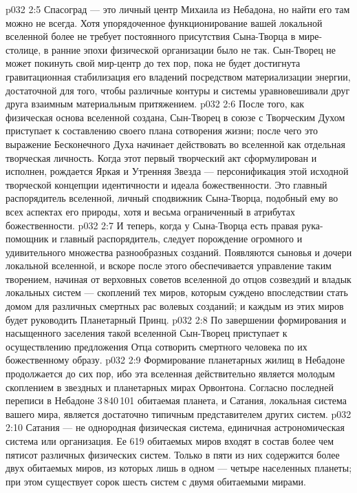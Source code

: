 \vs p032 2:5 Спасоград --- это личный центр Михаила из Небадона, но найти его там можно не всегда. Хотя упорядоченное функционирование вашей локальной вселенной более не требует постоянного присутствия Сына\hyp{}Творца в мире\hyp{}столице, в ранние эпохи физической организации было не так. Сын\hyp{}Творец не может покинуть свой мир\hyp{}центр до тех пор, пока не будет достигнута гравитационная стабилизация его владений посредством материализации энергии, достаточной для того, чтобы различные контуры и системы уравновешивали друг друга взаимным материальным притяжением.
\vs p032 2:6 \pc После того, как физическая основа вселенной создана, Сын\hyp{}Творец в союзе с Творческим Духом приступает к составлению своего плана сотворения жизни; после чего это выражение Бесконечного Духа начинает действовать во вселенной как отдельная творческая личность. Когда этот первый творческий акт сформулирован и исполнен, рождается Яркая и Утренняя Звезда --- персонификация этой исходной творческой концепции идентичности и идеала божественности. Это главный распорядитель вселенной, личный сподвижник Сына\hyp{}Творца, подобный ему во всех аспектах его природы, хотя и весьма ограниченный в атрибутах божественности.
\vs p032 2:7 И теперь, когда у Сына\hyp{}Творца есть правая рука\hyp{}помощник и главный распорядитель, следует порождение огромного и удивительного множества разнообразных созданий. Появляются сыновья и дочери локальной вселенной, и вскоре после этого обеспечивается управление таким творением, начиная от верховных советов вселенной до отцов созвездий и владык локальных систем --- скоплений тех миров, которым суждено впоследствии стать домом для различных смертных рас волевых созданий; и каждым из этих миров будет руководить Планетарный Принц.
\vs p032 2:8 По завершении формирования и насыщенного заселения такой вселенной Сын\hyp{}Творец приступает к осуществлению предложения Отца сотворить смертного человека по их божественному образу.
\vs p032 2:9 \pc Формирование планетарных жилищ в Небадоне продолжается до сих пор, ибо эта вселенная действительно является молодым скоплением в звездных и планетарных мирах Орвонтона. Согласно последней переписи в Небадоне 3\,840\,101 обитаемая планета, и Сатания, локальная система вашего мира, является достаточно типичным представителем других систем.
\vs p032 2:10 Сатания --- не однородная физическая система, единичная астрономическая система или организация. Ее 619 обитаемых миров входят в состав более чем пятисот различных физических систем. Только в пяти из них содержится более двух обитаемых миров, из которых лишь в одном --- четыре населенных планеты; при этом существует сорок шесть систем с двумя обитаемыми мирами.
